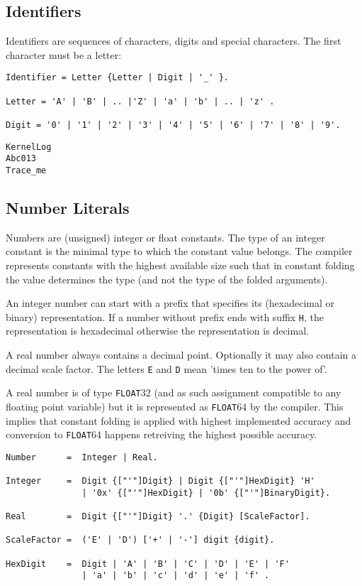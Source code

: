 \documentclass[a4wide,11pt]{article}
\newcommand{\FLOAT}{\lstinline"FLOAT"}
\begin{document}
\subsection{Identifiers}
Identifiers are sequences of characters, digits and special characters.
The first character must be a letter:

\begin{lstlisting}[style=ebnf]
Identifier = Letter {Letter | Digit | '_' }.

Letter = 'A' | 'B' | .. |'Z' | 'a' | 'b' | .. | 'z' .

Digit = '0' | '1' | '2' | '3' | '4' | '5' | '6' | '7' | '8' | '9'.
\end{lstlisting}


\begin{annotation}
\begin{lstlisting}[style=example,caption=Examples of valid identifiers]
KernelLog
Abc013
Trace_me
\end{lstlisting}
\end{annotation}

\subsection{Number Literals}
Numbers are (unsigned) integer or float constants.
The type of an integer constant is the minimal type to which the constant value belongs.
The compiler represents constants with the highest available size such that in constant folding the value determines the type (and not the type of the folded arguments).

An integer number can start with a prefix that specifies its (hexadecimal or binary) representation.
If a number without prefix ends with suffix \verb~H~, the representation is hexadecimal otherwise the representation is decimal.

A real number always contains a decimal point.
Optionally it may also contain a decimal scale factor.
The letters \verb~E~ and \verb~D~ mean 'times ten to the power of'.

A real number is of type \FLOAT32 (and as such assignment compatible to any floating point variable) but it is represented as \FLOAT64 by the compiler.
This implies that constant folding is applied with highest implemented accuracy and conversion to \FLOAT64 happens retreiving the highest possible accuracy.

\begin{lstlisting}[style=ebnf]
Number      =  Integer | Real.

Integer     =  Digit {["'"]Digit} | Digit {["'"]HexDigit} 'H'
               | '0x' {["'"]HexDigit} | '0b' {["'"]BinaryDigit}.

Real        =  Digit {["'"]Digit} '.' {Digit} [ScaleFactor].

ScaleFactor =  ('E' | 'D') ['+' | '-'] digit {digit}.

HexDigit    =  Digit | 'A' | 'B' | 'C' | 'D' | 'E' | 'F'
               | 'a' | 'b' | 'c' | 'd' | 'e' | 'f' .
\end{lstlisting}
\end{document}
